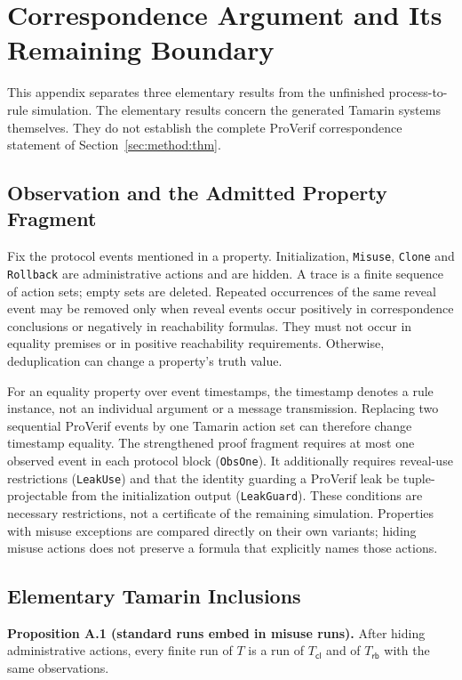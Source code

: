 \section{Correspondence Argument and Its Remaining Boundary}\label{app:proof}

This appendix separates three elementary results from the unfinished
process-to-rule simulation. The elementary results concern the generated
Tamarin systems themselves. They do not establish the complete
ProVerif correspondence statement of Section~\ref{sec:method:thm}.

\subsection{Observation and the Admitted Property Fragment}

Fix the protocol events mentioned in a property. Initialization,
\texttt{Misuse}, \texttt{Clone} and \texttt{Rollback} are administrative
actions and are hidden. A trace is a finite sequence of action sets;
empty sets are deleted. Repeated occurrences of the same reveal event
may be removed only when reveal events occur positively in correspondence
conclusions or negatively in reachability formulas. They must not occur
in equality premises or in positive reachability requirements. Otherwise,
deduplication can change a property's truth value.

For an equality property over event timestamps, the timestamp denotes a
rule instance, not an individual argument or a message transmission.
Replacing two sequential ProVerif events by one Tamarin action set can
therefore change timestamp equality. The strengthened proof fragment
requires at most one observed event in each protocol block
(\texttt{ObsOne}). It additionally requires reveal-use restrictions
(\texttt{LeakUse}) and that the identity guarding a ProVerif leak be
tuple-projectable from the initialization output (\texttt{LeakGuard}).
These conditions are necessary restrictions, not a certificate of the
remaining simulation. Properties with misuse exceptions are compared
directly on their own variants; hiding misuse actions does not preserve
a formula that explicitly names those actions.

\subsection{Elementary Tamarin Inclusions}

\noindent\textbf{Proposition A.1 (standard runs embed in misuse runs).}
After hiding administrative actions, every finite run of $T$ is a run
of $T_{\mathsf{cl}}$ and of $T_{\mathsf{rb}}$ with the same observations.

